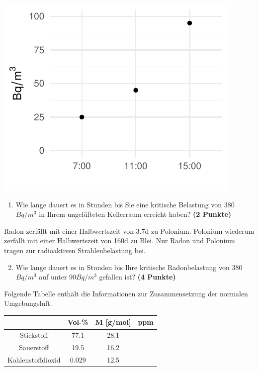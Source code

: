 \documentclass[a4paper, 9pt]{scrartcl}\usepackage[]{graphicx}\usepackage[]{xcolor}
\makeatletter
\def\maxwidth{ %
  \ifdim\Gin@nat@width>\linewidth
    \linewidth
  \else
    \Gin@nat@width
  \fi
}
\newenvironment{knitrout}{}{} %
\makeatother
\begin{document}
\begin{knitrout}
\color{fgcolor}

{\centering \includegraphics[width=\maxwidth]{img/math-10-1} 

}


\end{knitrout}

\vspace{-0.75cm}

\begin{enumerate}
\item Wie lange dauert es in Stunden bis Sie eine kritische Belastung von
  380$Bq/m^3$ in Ihrem ungelüfteten Kellerraum erreicht haben?
  \textbf{(2 Punkte)}
\end{enumerate}

Radon zerfällt mit einer Halbwertszeit von 3.7d zu
Polonium. Polonium wiederum zerfällt mit einer Halbwertszeit von
160d zu Blei. Nur Radon und Polonium tragen zur
radioaktiven Strahlenbelastung bei.

\begin{enumerate}
  \setcounter{enumi}{1}
\item Wie lange dauert es in Stunden bis Ihre kritische Radonbelastung von
  380$Bq/m^3$ auf unter 90$Bq/m^3$ gefallen ist?
  \textbf{(4 Punkte)}
\end{enumerate}

Folgende Tabelle enthält die Informationen zur Zusammensetzung der
normalen Umgebungsluft.

\begin{center}
  \begin{tabular}{ c|c|c|c }
     & Vol-\% & M [g/mol] & ppm \\
    \hline
    Stickstoff & 77.1 & 28.1 &
                                                    \phantom{1000000000000}\strut\\
        \hline
    Sauerstoff & 19.5 & 16.2 &
                                                    \phantom{10000000}\strut\\
        \hline
    Kohlenstoffdioxid & 0.029 & 12.5 & \phantom{10000000}\strut\\     
     \hline
\end{tabular}
\end{center}
\end{document}
